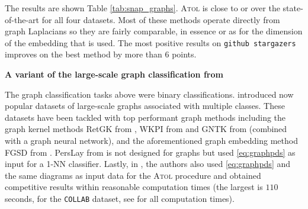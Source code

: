 \documentclass[noinfoline,preprint]{article}
\renewcommand{\1}{\mathds 1}
\begin{document}
\begin{table*}
	\caption{Large graph binary classification problems. Mean ROC-AUC and standard deviations.}
	\label{tab:snap_graphs}
\end{table*}

The results are shown Table \ref{tab:snap_graphs}. \textsc{Atol} is close to or over the state-of-the-art for all four datasets. Most of these methods operate directly from graph Laplacians so they are fairly comparable, in essence or as for the dimension of the embedding that is used. The most positive results on \texttt{github stargazers} improves on the best method by more than 6 points. 


\noindent
\textbf{A variant of the large-scale graph classification from \cite{Royer19}}

The graph classification tasks above were binary classifications. \cite{Yanardag15} introduced now popular datasets of large-scale graphs associated with multiple classes. These datasets have been tackled with top performant graph methods including the graph kernel methods RetGK from \cite{zhang2018retgk}, WKPI from \cite{qi2019} and GNTK from \cite{du19} (combined with a graph neural network), and the aforementioned graph embedding method FGSD from \cite{verma2017hunt}. PersLay from \cite{Carriere19} is not designed for graphs but used \eqref{eq:graphpds} as input for a 1-NN classifier. Lastly, in \cite{Royer19}, the authors also used \eqref{eq:graphpds} and the same diagrams as input data for the \textsc{Atol} procedure and obtained competitive results within reasonable computation times (the largest is $110$ seconds, for the \texttt{COLLAB} dataset, see \cite[Section 3.1]{Royer19} for all computation times).
\end{document}

